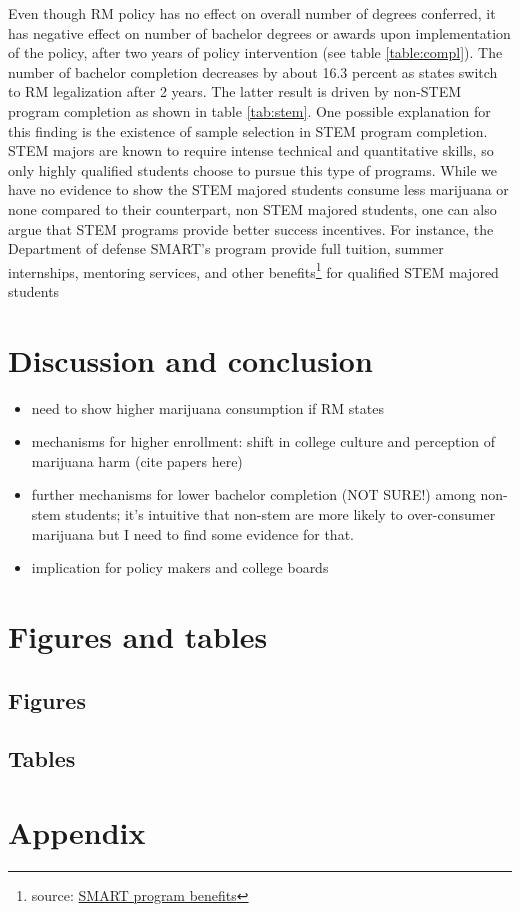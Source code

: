 \documentclass[12pt]{article}%
\begin{document}
Even though RM policy has no effect on overall number of degrees conferred, it has negative effect on number of bachelor degrees or awards upon implementation of the policy, after two years of policy intervention (see table \ref{table:compl}). The number of bachelor completion decreases by about 16.3 percent as states switch to RM legalization after 2 years.  The latter result is driven by non-STEM program completion as shown in table \ref{tab:stem}. One possible explanation for this finding is the existence of sample selection in STEM program completion. STEM majors are known to require intense technical and quantitative skills, so only highly qualified students choose to pursue this type of programs. While we have no evidence to show the STEM majored students consume less marijuana or none compared to their counterpart, non STEM majored students, one can also argue that STEM programs provide better success incentives. For instance, the Department of defense SMART's program provide full tuition, summer internships, mentoring services, and other benefits\footnote{source: \href{https://dodstem.us/participate/smart/}{SMART program benefits}} for qualified STEM majored students



\section{Discussion and conclusion} 

\begin{itemize}
\item need to show higher marijuana consumption if RM states


  
    \item mechanisms for higher enrollment: shift in college culture and perception of marijuana harm (cite papers here)
    \item further mechanisms for lower bachelor completion (NOT SURE!) among non-stem students; it's intuitive that non-stem are more likely to over-consumer marijuana but I need to find some evidence for that. 
    
    \item implication for policy makers and college boards
\end{itemize}


\newpage
\section*{Figures and tables} 
\subsection{Figures}


\newpage
\subsection{Tables}







\appendix
\section*{Appendix}
 
 







\newpage
\setlength\bibsep{0pt}


\end{document}
